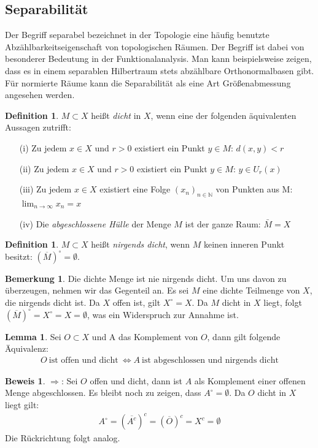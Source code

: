 \documentclass[10pt,a4paper]{article}
\theoremstyle{plain}
\theoremstyle{definition}
\newtheorem{definition}[satz]{Definition}
\newenvironment{dfi}{\begin{shaded}\begin{definition}}{\end{definition}\end{shaded}}
\newtheorem{lemma}[satz]{Lemma}
\newenvironment{lem}{\begin{shaded}\begin{lemma}}{\end{lemma}\end{shaded}}
\theoremstyle{nonumberplain}
\newtheorem{bemerkung}{Bemerkung}
\newenvironment{bem}{\begin{bemerkung}}{\end{bemerkung}}
\newtheorem{beweis}{Beweis}
\newenvironment{bew}{\begin{beweis}}{\end{beweis}}
\newcommand{\N}{\mathbb{N}}
\begin{document}
\subsection{Separabilität}

Der Begriff separabel bezeichnet in der Topologie eine häufig benutzte Abzählbarkeitseigenschaft von topologischen Räumen. Der Begriff ist dabei von besonderer Bedeutung in der Funktionalanalysis. Man kann beispielsweise zeigen, dass es in einem separablen Hilbertraum stets abzählbare Orthonormalbasen gibt. Für normierte Räume kann die Separabilität als eine Art Größenabmessung angesehen werden.
\begin{dfi}
$M \subset X$ heißt \textit{dicht} in $X$, wenn eine der folgenden äquivalenten Aussagen zutrifft:
\begin{itemize}
\item[(i)] Zu jedem $x \in X$ und  $r > 0$ existiert ein Punkt $y \in M$: $d(x,y)<r$
\item[(ii)] Zu jedem $x \in X$ und  $r > 0$ existiert ein Punkt $y \in M$: $y \in U_r (x)$
\item[(iii)] Zu jedem $x \in X$ existiert eine Folge ${(x_n)}_{n \in \N}$ von Punkten aus M: $\lim_{n \to \infty}{x_n} = x$
\item[(iv)] Die \textit{abgeschlossene Hülle} der Menge $M$ ist der ganze Raum: $\bar{M} = X$
\end{itemize}
\end{dfi}
\begin{dfi}
$M \subset X$ heißt \textit{nirgends dicht}, wenn $M$ keinen inneren Punkt besitzt: $(\overline{M})^\circ = \emptyset$.
\end{dfi}
\begin{bem}
Die dichte Menge ist nie nirgends dicht. Um uns davon zu überzeugen, nehmen wir das Gegenteil an. Es sei $M$ eine dichte Teilmenge von $X$, die nirgends dicht ist. Da $X$ offen ist, gilt $X^\circ = X$. Da $M$ dicht in $X$ liegt, folgt $(\overline{M})^\circ = X^\circ = X = \emptyset$, was ein Widerspruch zur Annahme ist.
\end{bem}
\begin{lem}
\label{dicht}
Sei $O \subset X$ und A das Komplement von $O$, dann gilt folgende Äquivalenz:
\begin{align*}
O \: \text{ist offen und dicht} \: \Leftrightarrow A \: \text{ist abgeschlossen und nirgends dicht}
\end{align*}
\end{lem}
\begin{bew}
$\Rightarrow$: Sei $O$ offen und dicht, dann ist $A$ als Komplement einer offenen Menge abgeschlossen. Es bleibt noch zu zeigen, dass $A^\circ = \emptyset$. Da $O$ dicht in $X$ liegt gilt:
\begin{align*}
A^\circ = (\overline{A^c})^c  = (\overline{O})^c = X^c = \emptyset
\end{align*}
 Die Rückrichtung folgt analog. 
\end{bew}
\end{document}
